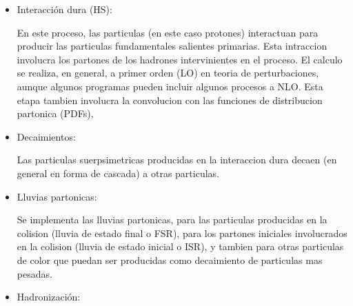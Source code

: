 \begin{itemize}

\item Interacción dura (HS):

  En este proceso, las particulas (en este caso protones) interactuan para
  producir las particulas fundamentales salientes primarias. Esta intraccion
  involucra los partones de los hadrones intervinientes en el proceso. El
  calculo se realiza, en general, a primer orden (LO) en teoria de perturbaciones,
  aunque algunos programas pueden incluir algunos procesos a NLO.
  Esta etapa tambien involucra la convolucion con las funciones de distribucion
  partonica (PDFs),


\item Decaimientos:

  Las particulas suerpsimetricas producidas en la interaccion dura decaen (en general
  en forma de cascada) a otras particulas.



\item Lluvias partonicas:

  Se implementa las lluvias partonicas, para las particulas producidas
  en la colision (lluvia de estado final o FSR), para los partones iniciales
  involucrados en la colision (lluvia de estado inicial o ISR), y tambien para otras
  particulas de color que puedan ser producidas como decaimiento de particulas mas pesadas.


\item Hadronización:


\end{itemize}
